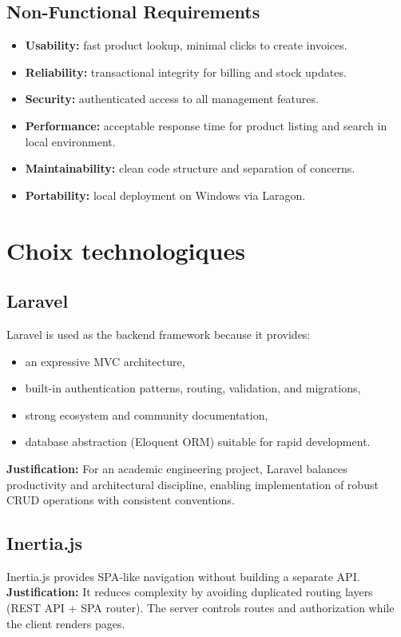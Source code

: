 \documentclass[12pt,a4paper]{report}
\begin{document}
\section{Non-Functional Requirements}
\begin{itemize}
  \item \textbf{Usability:} fast product lookup, minimal clicks to create invoices.
  \item \textbf{Reliability:} transactional integrity for billing and stock updates.
  \item \textbf{Security:} authenticated access to all management features.
  \item \textbf{Performance:} acceptable response time for product listing and search in local environment.
  \item \textbf{Maintainability:} clean code structure and separation of concerns.
  \item \textbf{Portability:} local deployment on Windows via Laragon.
\end{itemize}

\chapter{Choix technologiques}

\section{Laravel}
Laravel is used as the backend framework because it provides:
\begin{itemize}
  \item an expressive MVC architecture,
  \item built-in authentication patterns, routing, validation, and migrations,
  \item strong ecosystem and community documentation,
  \item database abstraction (Eloquent ORM) suitable for rapid development.
\end{itemize}
\textbf{Justification:} For an academic engineering project, Laravel balances productivity and architectural discipline, enabling implementation of robust CRUD operations with consistent conventions.

\section{Inertia.js}
Inertia.js provides SPA-like navigation without building a separate API.
\textbf{Justification:} It reduces complexity by avoiding duplicated routing layers (REST API + SPA router). The server controls routes and authorization while the client renders pages.
\end{document}

